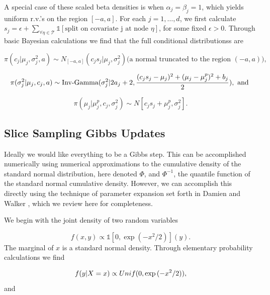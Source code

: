 A special case of these scaled beta densities is when $\alpha_j=\beta_j=1$, which yields uniform r.v.'s on the region  $[-a,a]$. 
For each $j=1, \dots, d$, we first calculate $s_j = \epsilon+\sum_{\forall \eta \in \mathcal{T}}\mathds{1}[\text{split on covariate j at node $\eta$}]$, for some fixed $\epsilon>0$.
Through basic Bayesian calculations we find that the full conditional distributionss are 

\begin{equation}
\pi(c_j\vert \mu_j, \sigma_j^2, a) \sim N_{[-a,a]}(c_js_j\vert \mu_j, \sigma^2_j) \text{(a normal truncated to the region $(-a,a)$),}
\end{equation}

\begin{equation}
\pi(\sigma^2_j \vert \mu_j, c_j, a) \sim \text{Inv-Gamma}({\sigma_j^2}\vert{2a_j+2},{\frac{(c_js_j-\mu_j)^2+ (\mu_j-\mu_j^p)^2+b_j}{2}}), \text{ and } 
\end{equation}

\begin{equation}
\pi(\mu_j\vert \mu_j^p, c_j, \sigma^2_j)\sim N[c_js_j+\mu_j^p, \sigma_j^2].
\end{equation}

\subsection{Slice Sampling Gibbs Updates}

Ideally we would like everything to be a Gibbs step. This can be accomplished numerically using numerical approximations to the cumulative density of the standard normal distribution, here denoted $\Phi$, and $\Phi^{-1}$, the quantile function of the standard normal cumulative density.  However, we can accomplish this directly using the technique of parameter expansion set forth in Damien and Walker \cite{damien2001sampling}, which we review here for completeness. 
 
We begin with the joint density of two random variables 

\begin{equation}
f(x,y) \propto \mathds{1}[0, \exp{(-x^2/2)}](y).
\end{equation}
The marginal of $x$ is a standard normal density. Through elementary probability calculations we find 

\begin{equation}\newnot{symbol:unif}
f(y\vert X=x) \propto Unif(0, \exp{(-x^2/2)}),
\end{equation}
 and 
 
